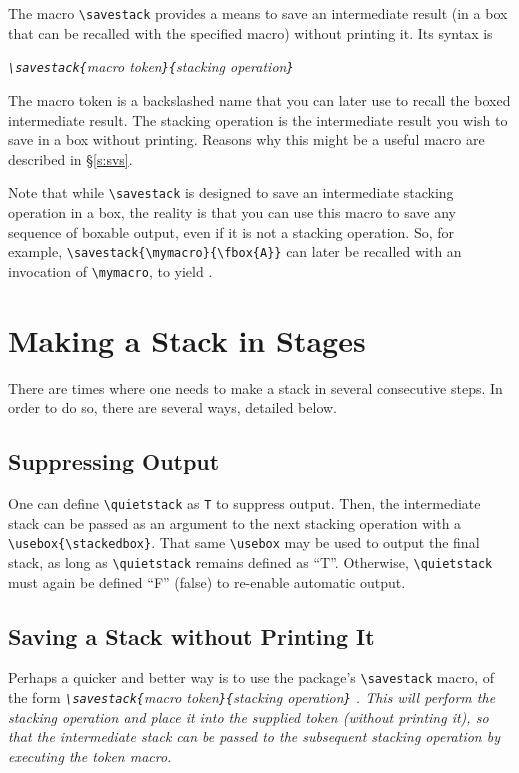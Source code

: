 \documentclass{article}
\let\vb\verb
\begin{document}
The macro \vb|\savestack| provides a means to save an intermediate
result (in a box that can be recalled with the specified macro) without
printing it.  Its syntax is

\itshape
\vb|\savestack{|macro token\vb|}{|stacking operation\vb|}|
\upshape

The macro token is a backslashed name that you can later use to recall
the boxed intermediate result.  The stacking operation is the
intermediate result you wish to save in a box without printing.  Reasons
why this might be a useful macro are described in \S\ref{s:svs}.

Note that while \vb|\savestack| is designed to save an intermediate
stacking operation in a box, the reality is that you can use this macro
to save any sequence of boxable output, even if it is not a stacking
operation.  So, for example, \vb|\savestack{\mymacro}{\fbox{A}}| can
later be recalled with an invocation of \vb|\mymacro|, to yield
\fboxsep=1pt\mymacro.\fboxsep=0pt

\section{Making a Stack in Stages}

There are times where one needs to make a stack in several consecutive
steps.  In order to do so, there are several ways, detailed below.  

\subsection{Suppressing Output\label{s:qs}}

One can define \vb|\quietstack| as \vb|T| to suppress output.  Then, the
intermediate stack can be passed as an argument to the next stacking
operation with a \vb|\usebox{\stackedbox}|.  That same \vb|\usebox|
may be used to output the final stack, as long as \vb|\quietstack|
remains defined as ``T''.  Otherwise, \vb|\quietstack| must again be
defined ``F'' (false) to re-enable automatic output.

\subsection{Saving a Stack without Printing It\label{s:svs}}

Perhaps a quicker and better way is to use the package's
\vb|\savestack| macro, of the form
\itshape\vb|\savestack{|macro token\vb|}{|stacking operation\vb|}|
\upshape.  This will perform the stacking operation and place it into
the supplied token (without printing it), so that the intermediate stack
can be passed to the subsequent stacking operation by executing the
token macro.
\end{document}

